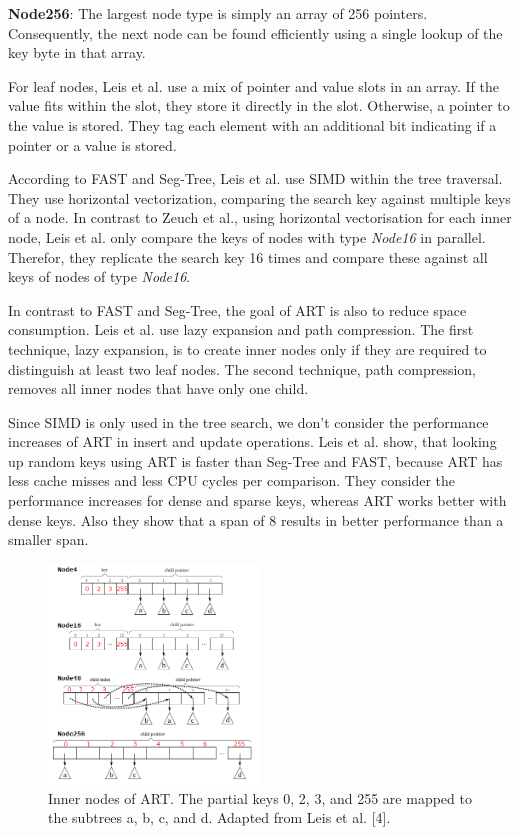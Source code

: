 \documentclass[conference]{IEEEtran}
\begin{document}
\textbf{Node256}: The largest node type is simply an array of 256 pointers. Consequently, the next node can be found efficiently using a single lookup of the key byte in that array. 

For leaf nodes, Leis et al. use a mix of pointer and value slots in an array. If the value fits within the slot, they store it directly in the slot. Otherwise, a pointer to the value is stored. They tag each element with an additional bit indicating if a pointer or a value is stored.

According to FAST and Seg-Tree, Leis et al. use SIMD within the tree traversal. They use horizontal vectorization, comparing the search key against multiple keys of a node. In contrast to Zeuch et al., using horizontal vectorisation for each inner node, Leis et al. only compare the keys of nodes with type \emph{Node16} in parallel. Therefor, they replicate the search key 16 times and compare these against all keys of nodes of type \emph{Node16}.

In contrast to FAST and Seg-Tree, the goal of ART is also to reduce space consumption. Leis et al. use lazy expansion and path compression. The first technique, lazy expansion, is to create inner nodes only if they are required to distinguish at least two leaf nodes. The second technique, path compression, removes all inner nodes that have only one child.

Since SIMD is only used in the tree search, we don't consider the performance increases of ART in insert and update operations. Leis et al. show, that looking up random keys using ART is faster than Seg-Tree and FAST, because ART has less cache misses and less CPU cycles per comparison. They consider the performance increases for dense and sparse keys, whereas ART works better with dense keys. Also they show that a span of 8 results in better performance than a smaller span. 

\begin{figure}
	\includegraphics[width=0.5\textwidth]{figure_4.png}
	\caption{Inner nodes of ART. The partial keys 0, 2, 3, and 255 are mapped to the subtrees a, b, c, and d. Adapted from Leis et al. [4].}
	\label{fig}
\end{figure}
\end{document}
